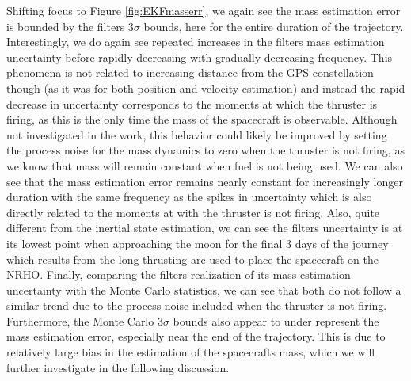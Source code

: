 \documentclass[letterpaper, paper,11pt]{AAS}		%
\begin{document}
Shifting focus to Figure \ref{fig:EKFmasserr}, we again see the mass estimation error is bounded by the filters $3\sigma$ bounds, here for the entire duration of the trajectory.  Interestingly, we do again see repeated increases in the filters mass estimation uncertainty before rapidly decreasing with gradually decreasing frequency. This phenomena is not related to increasing distance from the GPS constellation though (as it was for both position and velocity estimation) and instead the rapid decrease in uncertainty corresponds to the moments at which the thruster is firing, as this is the only time the mass of the spacecraft is observable. Although not investigated in the work, this behavior could likely be improved by setting the process noise for the mass dynamics to zero when the thruster is not firing, as we know that mass will remain constant when fuel is not being used. We can also see that the mass estimation error remains nearly constant for increasingly longer duration with the same frequency as the spikes in uncertainty which is also directly related to the moments at with the thruster is not firing. Also, quite different from the inertial state estimation, we can see the filters uncertainty is at its lowest point when approaching the moon for the final 3 days of the journey which results from the long thrusting arc used to place the spacecraft on the NRHO. Finally, comparing the filters realization of its mass estimation uncertainty with the Monte Carlo statistics, we can see that both do not follow a similar trend due to the process noise included when the thruster is not firing. Furthermore, the Monte Carlo $3\sigma$ bounds also appear to under represent the mass estimation error, especially near the end of the trajectory. This is due to relatively large bias in the estimation of the spacecrafts mass, which we will further investigate in the following discussion. 
\end{document}
